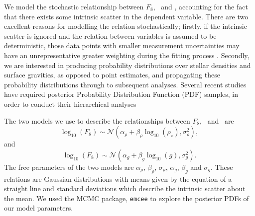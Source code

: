 We model the stochastic relationship between $F_8$, \logg\ and \rhostar,
accounting for the fact that there exists some intrinsic scatter in
the dependent variable.
There are two excellent reasons for modelling the relation stochastically;
firstly, if the intrinsic scatter is ignored and the relation between
variables is assumed to be deterministic, those data points with smaller
measurement uncertainties may have an unrepresentative greater weighting
during the fitting process \citep{hogg:2010b}.
Secondly, we are interested in producing probability distributions over
stellar densities and surface gravities, as opposed to point estimates, and
propagating these probability distributions through to subsequent analyses.
Several recent studies have required posterior Probability Distribution
Function (PDF) samples, in order to conduct their hierarchical analyses
\citep[e.g.][]{foreman-mackey:2014, rogers:2015, angus:2015}


The two models we use to describe the relationships between $F_8$, \logg\ and
\rhostar\ are
\begin{equation}
	\log_{10}(F_8) \sim \mathcal{N} \left(\alpha_\rho +
    \beta_\rho \log_{10}(\rho_\star), \sigma_\rho^2 \right),
\end{equation}
\label{eq:rho}
and
\begin{equation}
	\log_{10}(F_8) \sim \mathcal{N} \left(\alpha_g + \beta_g
    \log_{10}(g), \sigma_g^2 \right).
\end{equation}
\label{eq:logg}
The free parameters of the two models are $\alpha_\rho$, $\beta_\rho$,
$\sigma_\rho$, $\alpha_g$, $\beta_g$ and $\sigma_g$.
These relations are Gaussian distributions with means given by the equation of
a straight line and standard deviations which describe the intrinsic scatter
about the mean.
We used the MCMC package, {\tt emcee} \citep{foreman-mackey:2013} to explore the
posterior PDFs of our model parameters.

